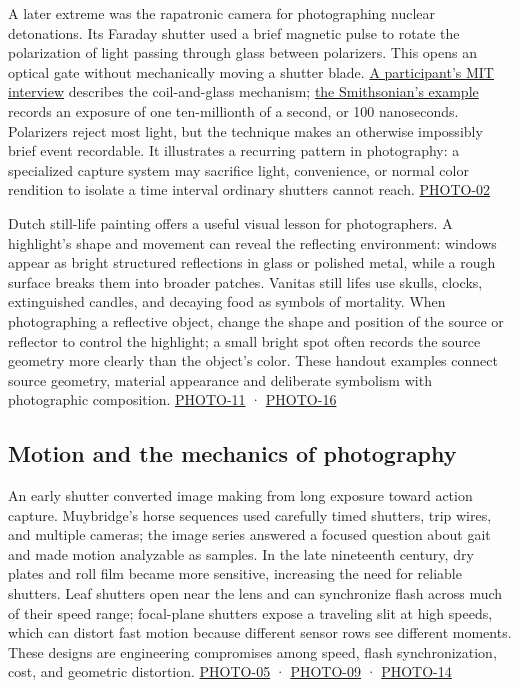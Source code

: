 A later extreme was the rapatronic camera for photographing nuclear detonations. Its Faraday shutter used a brief magnetic pulse to rotate the polarization of light passing through glass between polarizers. This opens an optical gate without mechanically moving a shutter blade. \href{https://infinite.mit.edu/video/charles-wyckoff-working-doc\%E2\%80\%99-edgerton-1995-interview/}{A participant's MIT interview} describes the coil-and-glass mechanism; \href{https://americanhistory.si.edu/collections/object/nmah_1393360}{the Smithsonian's example} records an exposure of one ten-millionth of a second, or 100 nanoseconds. Polarizers reject most light, but the technique makes an otherwise impossibly brief event recordable. It illustrates a recurring pattern in photography: a specialized capture system may sacrifice light, convenience, or normal color rendition to isolate a time interval ordinary shutters cannot reach. \hyperref[04-visual-computing-ii-ch036-photo-02---photography-session-02]{PHOTO-02}

Dutch still-life painting offers a useful visual lesson for photographers. A highlight's shape and movement can reveal the reflecting environment: windows appear as bright structured reflections in glass or polished metal, while a rough surface breaks them into broader patches. Vanitas still lifes use skulls, clocks, extinguished candles, and decaying food as symbols of mortality. When photographing a reflective object, change the shape and position of the source or reflector to control the highlight; a small bright spot often records the source geometry more clearly than the object's color. These handout examples connect source geometry, material appearance and deliberate symbolism with photographic composition. \hyperref[04-visual-computing-ii-ch036-photo-11---photography-session-11]{PHOTO-11} · \hyperref[04-visual-computing-ii-ch036-photo-16---photography-session-16]{PHOTO-16}

\subsection{Motion and the mechanics of photography}\label{04-visual-computing-ii-ch034-motion-and-the-mechanics-of-photography}

An early shutter converted image making from long exposure toward action capture. Muybridge's horse sequences used carefully timed shutters, trip wires, and multiple cameras; the image series answered a focused question about gait and made motion analyzable as samples. In the late nineteenth century, dry plates and roll film became more sensitive, increasing the need for reliable shutters. Leaf shutters open near the lens and can synchronize flash across much of their speed range; focal-plane shutters expose a traveling slit at high speeds, which can distort fast motion because different sensor rows see different moments. These designs are engineering compromises among speed, flash synchronization, cost, and geometric distortion. \hyperref[04-visual-computing-ii-ch036-photo-05---photography-session-05]{PHOTO-05} · \hyperref[04-visual-computing-ii-ch036-photo-09---photography-session-09]{PHOTO-09} · \hyperref[04-visual-computing-ii-ch036-photo-14---photography-session-14]{PHOTO-14}

